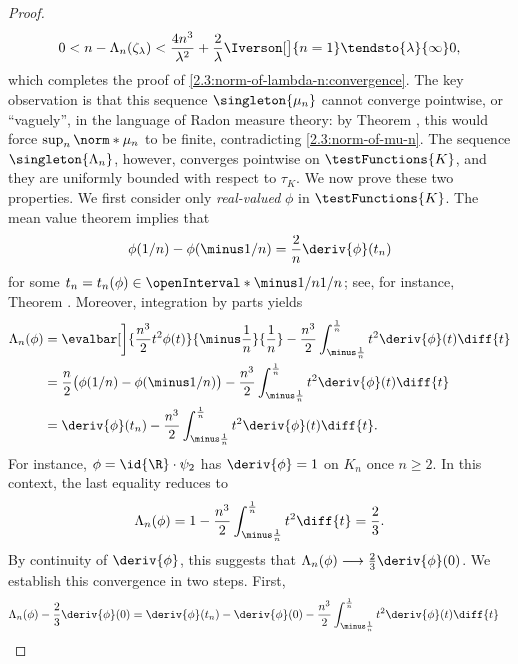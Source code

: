 \begin{proof}
\begin{equation}
  0 < n - \Lambda_n (\zeta_\lambda ) < \frac{4n^3}{\lambda^2} %
    + \frac{2}{\lambda} \Iverson[\big]{n=1} \tendsto{\lambda}{\infty}0, 
\end{equation}
%
which completes the proof of \eqref{2.3:norm-of-lambda-n:convergence}. The key observation is that this sequence %
$\singleton{\mu_n}$ cannot converge pointwise, or ``vaguely'', in the language of Radon measure theory: by Theorem %
, this would force $\sup_n \norm*{\mu_n}$ to be finite, contradicting \eqref{2.3:norm-of-mu-n}.
\skipline
The sequence $\singleton{\Lambda_n}$, however, converges pointwise on $\testFunctions{K}$, and they are uniformly bounded with 
respect to $\tau_K$. We now prove these two properties. We first consider only \emph{real-valued} $\phi$ in %
$\testFunctions{K}$. The mean value theorem implies that 
% 
\begin{equation}
  \phi(1/n)- \phi(\minus 1/n) = \frac{2}{n}\deriv{\phi}(t_n)
\end{equation}
% 
for some $t_n = t_n(\phi)\in \openInterval*{\minus 1/n}{1/n}$; see, for instance, Theorem . Moreover,
integration by parts yields %
% 
\begin{align}
  \Lambda_n(\phi) & = \evalbar[\bigg]{\frac{n^3}{2}t^2 \phi(t)}{\minus \frac{1}{n}}{\frac{1}{n}} 
      - \frac{n^3}{2} \int_{\minus \frac{1}{n}}^{\frac{1}{n}} t^2 \deriv{\phi}(t) \diff{t} \\
  & = \frac{n}{2}\bigl(\phi(1/n) - \phi(\minus 1/n)\bigr)
      - \frac{n^3}{2} \int_{\minus \frac{1}{n}}^{\frac{1}{n}} t^2 \deriv{\phi}(t) \diff{t} %
      \label{2.3:integration-by-parts:difference}\\
  & = \deriv{\phi}(t_n) 
      - \frac{n^3}{2} \int_{\minus \frac{1}{n}}^{\frac{1}{n}} t^2 \deriv{\phi}(t) \diff{t}. 
\end{align}
% 
For instance, $\phi = \id{\R} \cdot \psi_2$ has $\deriv{\phi} = 1$ on $K_n$ once $n \geq 2$. In this context, the last %
equality reduces to 
% 
\begin{equation}
  \Lambda_n(\phi) = 1 - \frac{n^3}{2} \int_{\minus \frac{1}{n}}^{\frac{1}{n}} t^2 \diff{t} = \frac{2}{3}.
\end{equation}
% 
By continuity of $\deriv{\phi}$, this suggests that $\Lambda_n(\phi) \longrightarrow \frac{2}{3}\deriv{\phi}(0)$. %
We establish this convergence in two steps. First, 
% 
\begin{align}
  \Lambda_n(\phi) - \frac{2}{3}\deriv{\phi}(0) & = \deriv{\phi}(t_n) - \deriv{\phi}(0) %
      - \frac{n^3}{2} \int_{\minus \frac{1}{n}}^{\frac{1}{n}} t^2 \deriv{\phi}(t) \diff{t}

\end{align}
\end{proof}
